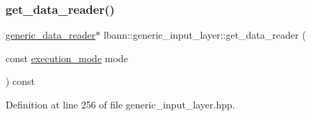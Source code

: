 \subsubsection{\texorpdfstring{get\+\_\+data\+\_\+reader()}{get\_data\_reader()}\hspace{0.1cm}{\footnotesize\ttfamily [1/2]}}
{\footnotesize\ttfamily \hyperlink{classlbann_1_1generic__data__reader}{generic\+\_\+data\+\_\+reader}$\ast$ lbann\+::generic\+\_\+input\+\_\+layer\+::get\+\_\+data\+\_\+reader (\begin{DoxyParamCaption}\item[{const \hyperlink{base_8hpp_a2781a159088df64ed7d47cc91c4dc0a8}{execution\+\_\+mode}}]{mode }\end{DoxyParamCaption}) const\hspace{0.3cm}{\ttfamily [inline]}}



Definition at line 256 of file generic\+\_\+input\+\_\+layer.\+hpp.


